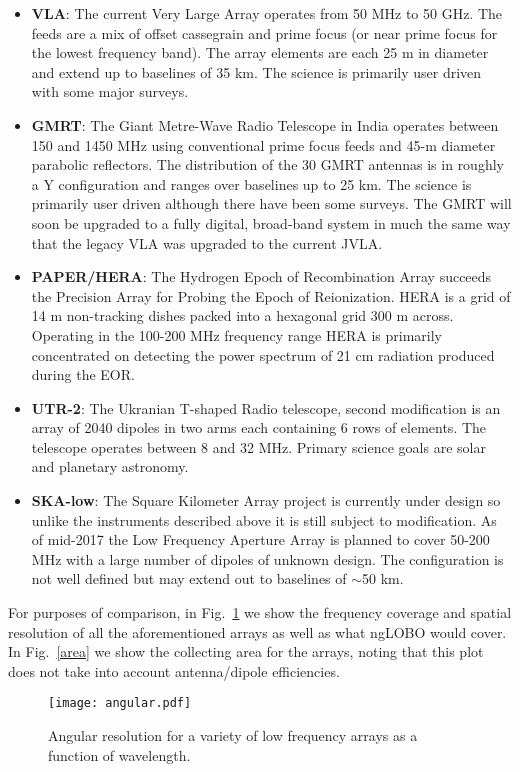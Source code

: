 \documentclass[11pt]{article}
\begin{document}
\begin{itemize}
    \item {\bf VLA}: The current Very Large Array operates from 50 MHz to 50 GHz.  The feeds are a mix of offset cassegrain and prime focus (or near prime focus for the lowest frequency band).  The array elements are each 25 m in diameter and extend up to baselines of 35 km.  The science is primarily user driven with some major surveys.
    \item {\bf GMRT}:  The Giant Metre-Wave Radio Telescope in India operates between 150 and 1450 MHz using conventional prime focus feeds and 45-m diameter parabolic reflectors.  The distribution of the 30 GMRT antennas is in roughly a Y configuration and ranges over baselines up to 25 km.  The science is primarily user driven although there have been some surveys. The GMRT will soon be upgraded to a fully digital, broad-band system in much the same way that the legacy VLA was upgraded to the current JVLA.
    \item {\bf PAPER/HERA}: The Hydrogen Epoch of Recombination Array succeeds the Precision Array for Probing the Epoch of Reionization. HERA is a grid of 14 m non-tracking dishes packed into a hexagonal grid 300 m across.  Operating in the 100-200 MHz frequency range HERA is primarily concentrated on detecting the power spectrum of 21 cm radiation produced during the EOR.
    \item {\bf UTR-2}: The Ukranian T-shaped Radio telescope, second modification is an array of 2040 dipoles in two arms each containing 6 rows of elements.  The telescope operates between 8 and 32 MHz.  Primary science goals are solar and planetary astronomy.
    \item {\bf SKA-low}: The Square Kilometer Array project is currently under design so unlike the instruments described above it is still subject to modification.  As of mid-2017 the Low Frequency Aperture Array is planned to cover 50-200 MHz with a large number of dipoles of unknown design.  The configuration is not well defined but may extend out to baselines of $\sim$50 km.
\end{itemize}

For purposes of comparison, 
in Fig.~\ref{angular} we show the frequency coverage and spatial resolution of all the aforementioned arrays as well as what ngLOBO would cover.  In Fig.~\ref{area} we show the collecting area for the arrays, noting that this plot does not take into account antenna/dipole efficiencies.

\begin{figure}[t!]
\begin{center}
\vspace{-1cm}
\texttt{[image: angular.pdf]}
\end{center}
\vspace{-0.5cm}
  \caption{
Angular resolution for a variety of low frequency arrays as a function of wavelength.
}
\label{angular}
\end{figure}
\end{document}
